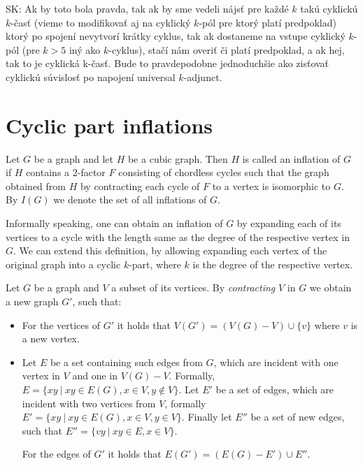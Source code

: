 \documentclass[12pt, twoside]{book}
\begin{document}
SK: Ak by toto bola pravda, tak ak by sme vedeli nájsť pre každé $k$ takú cyklickú $k$-časť (vieme to modifikovať aj na cyklický $k$-pól pre ktorý platí predpoklad) ktorý po spojení nevytvorí krátky cyklus, tak ak dostaneme na vstupe cyklický $k$-pól (pre $k>5$ iný ako $k$-cyklus), stačí nám overiť či platí predpoklad, a ak hej, tak to je cyklická k-časť. Bude to pravdepodobne jednoduchšie ako zisťovať cyklickú súvislosť po napojení universal $k$-adjunct.

\section{Cyclic part inflations}\label{sec:cyclic-part-inflations}

\begin{definition}
	Let $G$ be a graph and let $H$ be a cubic graph. Then $H$ is called an inflation of $G$ if $H$ contains a 2-factor $F$ consisting of chordless cycles such that the graph obtained from $H$ by contracting each cycle of $F$ to a vertex is isomorphic to $G$. By $I(G)$ we denote the set of all inflations of $G$.
\end{definition}

Informally speaking, one can obtain an inflation of $G$ by expanding each of its vertices to a cycle with the length same as the degree of the respective vertex in $G$. We can extend this definition, by allowing expanding each vertex of the original graph into a cyclic $k$-part, where $k$ is the degree of the respective vertex.


Let $G$ be a graph and $V$ a subset of its vertices. By \textit{contracting} $V$ in $G$ we obtain a new graph $G'$, such that:
\begin{itemize}
	\item For the vertices of $G'$ it holds that $V(G') = (V(G)-V)\cup \{v\}$ where $v$ is a new vertex.
	\item Let $E$ be a set containing such edges from $G$, which are incident with one vertex in $V$ and one in $V(G)-V$. Formally, ${E=\{xy~|~xy\in E(G), x\in V, y\notin V\}}$. Let $E'$ be a set of edges, which are incident with two vertices from $V$, formally ${E'=\{xy ~|~ xy\in E(G), x\in V, y\in V\}}$. Finally let $E''$ be a set of new edges, such that $E''=\{vy~|~ xy\in E, x\in V\}$.
	
	For the edges of $G'$ it holds that ${E(G')=(E(G)-E')\cup E''}$.
\end{itemize}
\end{document}
